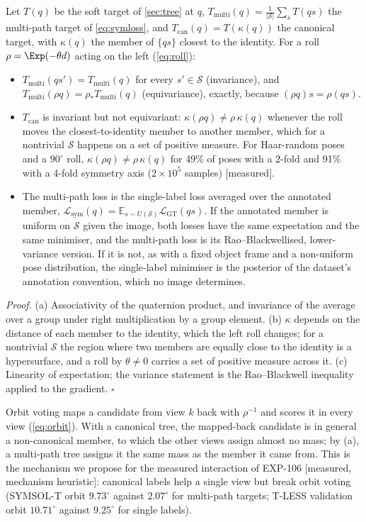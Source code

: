 \begin{proposition}\label{prop:multipath}
Let $T(q)$ be the soft target of \cref{sec:tree} at $q$, $T_{\mathrm{multi}}(q)=\frac{1}{|\mathcal S|}\sum_sT(qs)$ the
multi-path target of \cref{eq:symloss}, and $T_{\mathrm{can}}(q)=T(\kappa(q))$ the canonical target, with $\kappa(q)$ the
member of $\{qs\}$ closest to the identity. For a roll $\rho=\Exp(-\theta d)$ acting on the left (\cref{eq:roll}):
\begin{itemize}
\item[(a)] $T_{\mathrm{multi}}(qs')=T_{\mathrm{multi}}(q)$ for every $s'\in\mathcal S$ (invariance), and $T_{\mathrm{multi}}(\rho q)=\rho_\ast T_{\mathrm{multi}}(q)$
(equivariance), exactly, because $(\rho q)s=\rho(qs)$.
\item[(b)] $T_{\mathrm{can}}$ is invariant but not equivariant: $\kappa(\rho q)\ne\rho\,\kappa(q)$ whenever the roll moves the closest-to-identity member
to another member, which for a nontrivial $\mathcal S$ happens on a set of positive measure. For Haar-random poses and a $90^\circ$ roll, $\kappa(\rho q)\ne\rho\,\kappa(q)$ for 49\% of poses with a 2-fold and 91\% with a 4-fold symmetry axis ($2\times10^5$ samples) [measured].
\item[(c)] The multi-path loss is the single-label loss averaged over the annotated member, $\mathcal L_{\mathrm{sym}}(q)=\mathbb E_{s\sim U(\mathcal S)}\mathcal L_{\mathrm{GT}}(qs)$.
If the annotated member is uniform on $\mathcal S$ given the image, both losses have the same expectation and the same minimiser, and the
multi-path loss is its Rao--Blackwellised, lower-variance version. If it is not, as with a fixed object frame and a non-uniform
pose distribution, the single-label minimiser is the posterior of the dataset's annotation convention, which no image determines.
\end{itemize}
\end{proposition}
\noindent\emph{Proof.} (a) Associativity of the quaternion product, and invariance of the average over a group under
right multiplication by a group element. (b) $\kappa$ depends on the distance of each member to the identity, which the left
roll changes; for a nontrivial $\mathcal S$ the region where two members are equally close to the identity is a hypersurface,
and a roll by $\theta\ne0$ carries a set of positive measure across it. (c) Linearity of expectation; the variance statement is
the Rao--Blackwell inequality applied to the gradient. \hfill$\square$

\noindent Orbit voting maps a candidate from view $k$ back with $\rho^{-1}$ and scores it in every view
(\cref{eq:orbit}). With a canonical tree, the mapped-back candidate is in general a non-canonical member, to which the
other views assign almost no mass; by (a), a multi-path tree assigns it the same mass as the member it came from. This is the
mechanism we propose for the measured interaction of EXP-106 [measured, mechanism heuristic]: canonical labels help a single view
but break orbit voting (SYMSOL-T orbit $9.73^\circ$ against $2.07^\circ$ for multi-path targets; T-LESS validation orbit
$10.71^\circ$ against $9.25^\circ$ for single labels).

